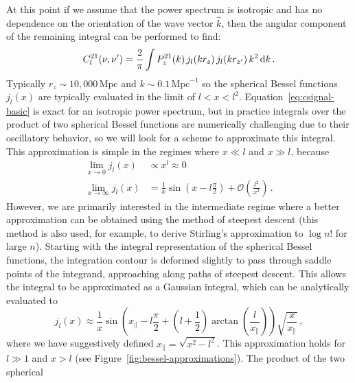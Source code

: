 \begin{bibunit}
At this point if we assume that the power spectrum is isotropic and has no dependence on the
orientation of the wave vector $\hat k$, then the angular component of the remaining integral can be
performed to find:
\begin{equation}\label{eq:csignal-basic}
    C^{21}_l(\nu, \nu^\prime) =
        \frac{2}{\pi}
        \int
        P_z^{21}(k) \,
        j_l(k r_z) \,
        j_l(k r_{z^\prime}) \,
        k^2 \, {\textrm d} k\,.
\end{equation}
Typically $r_z\sim 10,000\,\text{Mpc}$ and $k\sim 0.1\,\text{Mpc}^{-1}$ so the spherical Bessel
functions $j_l(x)$ are typically evaluated in the limit of $l < x < l^2$.
Equation~\ref{eq:csignal-basic} is exact for an isotropic power spectrum, but in practice integrals
over the product of two spherical Bessel functions are numerically challenging due to their
oscillatory behavior, so we will look for a scheme to approximate this integral.  This approximation
is simple in the regimes where $x \ll l$ and $x \gg l$, because
\begin{align}
    \lim_{x\rightarrow 0} j_l(x) &\propto x^l \approx 0 \\
    \lim_{x\rightarrow\infty} j_l(x) &=
        \frac{1}{x} \sin\left(x - l\frac{\pi}{2}\right)
        + \mathcal{O}\left(\frac{l^2}{x^2}\right)
    \,.
\end{align}
However, we are primarily interested in the intermediate regime where a better approximation can be
obtained using the method of steepest descent (this method is also used, for example, to derive
Stirling's approximation to $\log n!$ for large $n$). Starting with the integral representation of
the spherical Bessel functions, the integration contour is deformed slightly to pass through saddle
points of the integrand, approaching along paths of steepest descent. This allows the integral to be
approximated as a Gaussian integral, which can be analytically evaluated to
\begin{equation}
    j_l(x) \approx
        \frac{1}{x}
        \sin\left(
            x_\parallel - l\frac{\pi}{2}
            + \left(l+\frac{1}{2}\right)\arctan\left(\frac{l}{x_\parallel}\right)
        \right)
        \sqrt{\frac{x}{x_\parallel}}
    \,,
\end{equation}
where we have suggestively defined $x_\parallel = \sqrt{x^2-l^2}$.  This approximation holds for
$l\gg 1$ and $x > l$ (see Figure~\ref{fig:bessel-approximations}). The product of the two spherical

\end{bibunit}
